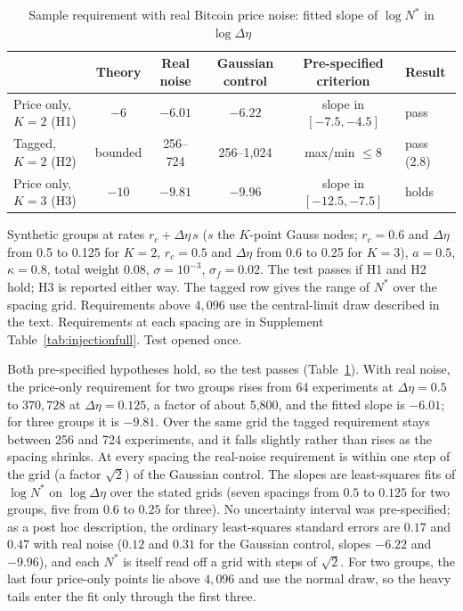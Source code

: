 \documentclass[12pt]{article}
\theoremstyle{definition}
\theoremstyle{remark}
\begin{document}
\begin{table}[t]\centering\small
\begin{threeparttable}
\caption{Sample requirement with real Bitcoin price noise: fitted slope of $\log N^*$ in $\log\Delta\eta$}\label{tab:injection}
\begin{tabular}{lccccl}
\toprule
 & Theory & Real noise & Gaussian control & Pre-specified criterion & Result\\
\midrule
Price only, $K=2$ (H1) & $-6$ & $-6.01$ & $-6.22$ & slope in $[-7.5,-4.5]$ & pass\\
Tagged, $K=2$ (H2) & bounded & 256--724 & 256--1{,}024 & max/min $\le8$ & pass (2.8)\\
Price only, $K=3$ (H3) & $-10$ & $-9.81$ & $-9.96$ & slope in $[-12.5,-7.5]$ & holds\\
\bottomrule
\end{tabular}
\begin{tablenotes}\footnotesize\item Synthetic groups at rates $r_c+\Delta\eta\,s$ ($s$ the $K$-point Gauss nodes; $r_c=0.6$ and $\Delta\eta$ from 0.5 to 0.125 for $K=2$, $r_c=0.5$ and $\Delta\eta$ from 0.6 to 0.25 for $K=3$), $a=0.5$, $\kappa=0.8$, total weight 0.08, $\sigma=10^{-3}$, $\sigma_f=0.02$. The test passes if H1 and H2 hold; H3 is reported either way. The tagged row gives the range of $N^*$ over the spacing grid. Requirements above $4{,}096$ use the central-limit draw described in the text. Requirements at each spacing are in Supplement Table~\ref{tab:injectionfull}. Test opened once.\end{tablenotes}
\end{threeparttable}
\end{table}

Both pre-specified hypotheses hold, so the test passes (Table~\ref{tab:injection}). With real noise, the price-only requirement for two groups rises from 64 experiments at $\Delta\eta=0.5$ to $370{,}728$ at $\Delta\eta=0.125$, a factor of about 5{,}800, and the fitted slope is $-6.01$; for three groups it is $-9.81$. Over the same grid the tagged requirement stays between 256 and 724 experiments, and it falls slightly rather than rises as the spacing shrinks. At every spacing the real-noise requirement is within one step of the grid (a factor $\sqrt2$) of the Gaussian control. The slopes are least-squares fits of $\log N^*$ on $\log\Delta\eta$ over the stated grids (seven spacings from $0.5$ to $0.125$ for two groups, five from $0.6$ to $0.25$ for three). No uncertainty interval was pre-specified; as a post hoc description, the ordinary least-squares standard errors are $0.17$ and $0.47$ with real noise ($0.12$ and $0.31$ for the Gaussian control, slopes $-6.22$ and $-9.96$), and each $N^*$ is itself read off a grid with steps of $\sqrt2$. For two groups, the last four price-only points lie above $4{,}096$ and use the normal draw, so the heavy tails enter the fit only through the first three.
\end{document}
